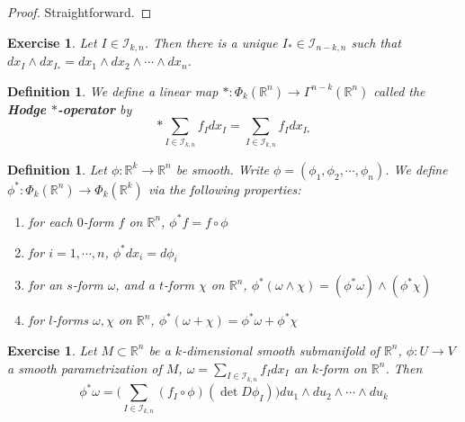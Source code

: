 \documentclass[12pt]{amsart}
\newtheorem{defn}[thm]{Definition}
\newtheorem{ex}[thm]{Exercise}
\newcommand{\om}{\omega}
\newcommand{\R}{\mathbb{R}}
\newcommand{\MI}{\mathcal{I}}
\begin{document}
	\begin{proof}
		Straightforward.
	\end{proof}

	\begin{ex}
		Let $I \in \MI_{k, n}$. Then there is a unique $I_* \in \MI_{n-k, n}$ such that $dx_I \wedge dx_{I_*} = dx_1 \wedge dx_2 \wedge \cdots \wedge dx_n$.
	\end{ex}
	
	\begin{defn}
		We define a linear map $*:\Phi_k(\R^n) \rightarrow \Gamma^{n-k}(\R^n)$ called the \textbf{Hodge $*$-operator} by $$* \sum\limits_{I \in \MI_{k,n}} f_I dx_I = \sum\limits_{I \in \MI_{k,n}} f_Idx_{I_*}$$
	\end{defn}

	\begin{defn}
		Let $\phi: \R^k \rightarrow \R^n$ be smooth. Write $\phi = (\phi_1, \phi_2, \cdots, \phi_n)$. We define $\phi^*:\Phi_k(\R^n) \rightarrow \Phi_k(\R^k)$ via the following properties: 
		\begin{enumerate}
			\item for each $0$-form $f$ on $\R^n$, $\phi^*f = f \circ \phi$
			\item  for $i = 1, \cdots , n$, $\phi^* dx_i = d\phi_i$ 
			\item for an $s$-form $\om$, and a $t$-form $\chi$ on $\R^n$,  $\phi^* (\om \wedge \chi) = (\phi^*\om) \wedge (\phi^*\chi)$
			\item for $l$-forms $\om, \chi$ on $\R^n$, $\phi^*(\om + \chi) = \phi^*\om + \phi^*\chi$ 
		\end{enumerate}
	\end{defn}

	\begin{ex}
			Let $M \subset \R^n$ be a $k$-dimensional smooth submanifold of $\R^n$, $\phi: U \rightarrow V$ a smooth parametrization of $M$, $\om = \sum_{I \in \MI_{k,n}} f_Idx_I$  an $k$-form on $\R^n$. Then $$\phi^* \om = \bigg( \sum_{I \in \MI_{k, n}} (f_I \circ \phi) (\det D\phi_I)\bigg)du_1 \wedge du_2 \wedge \cdots \wedge du_k$$ 
	\end{ex}
\end{document}

